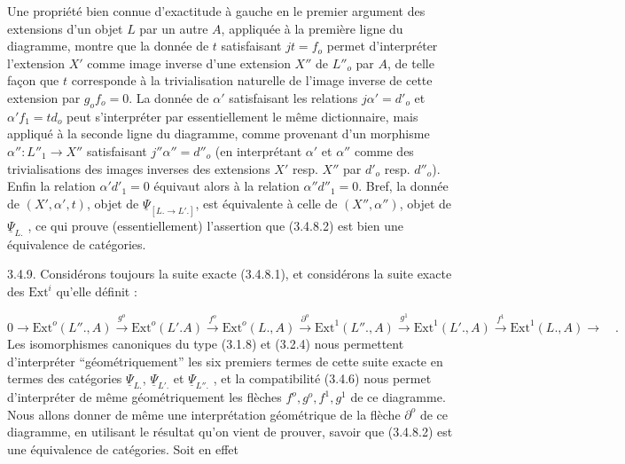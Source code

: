 Une propriété bien connue d'exactitude à gauche en le premier argument des extensions d'un objet $L$ par un autre $A$, appliquée à la première ligne du diagramme, montre que la donnée de $t$ satisfaisant $jt = f_o$ permet d'interpréter l'extension $X'$ comme image inverse d'une extension $X''$ de $L''_o$ par $A$, de telle façon que $t$ corresponde à la trivialisation naturelle de l'image inverse de cette extension par $g_o f_o = 0$. La donnée de $\alpha'$ satisfaisant les relations $j\alpha' = d'_o$ et $\alpha'f_1 = td_o$ peut s'interpréter par essentiellement le même dictionnaire, mais appliqué à la seconde ligne du diagramme, comme provenant d'un morphisme $\alpha'' : L''_1 \longrightarrow X''$ satisfaisant $j''\alpha'' = d''_o$ (en interprétant $\alpha'$ et $\alpha''$ comme des trivialisations des images inverses des extensions $X'$ resp. $X''$ par $d'_o$ resp. $d''_o$). Enfin la relation $\alpha'd'_1 = 0$ équivaut alors à la relation $\alpha''d''_1 = 0$. Bref, la donnée de $(X',\alpha',t)$, objet de $\underline{\Psi}_{[L. \longrightarrow L'.]}$, est équivalente à celle de $(X'',\alpha'')$, objet de $\underline{\Psi}_{L.}$ , ce qui prouve (essentiellement) l'assertion que (3.4.8.2) est bien une équivalence de catégories.

3.4.9. Considérons toujours la suite exacte (3.4.8.1), et considérons la suite exacte des $\mathrm{Ext}^i$ qu'elle définit :

\begin{equation}\tag{3.4.9.1}
0 \longrightarrow \mathrm{Ext}^o(L''.,A) \stackrel{g^o}{\longrightarrow} \mathrm{Ext}^o(L'.A) \stackrel{f^o}{\longrightarrow} \mathrm{Ext}^o(L.,A) \stackrel{\partial^o}{\longrightarrow} \mathrm{Ext}^1(L''.,A) \stackrel{g^1}{\longrightarrow} \mathrm{Ext}^1(L'.,A) \stackrel{f^1}{\longrightarrow} \mathrm{Ext}^1(L.,A) \longrightarrow \quad .
\end{equation}
Les isomorphismes canoniques du type (3.1.8) et (3.2.4) nous permettent d'interpréter ``géométriquement'' les six premiers termes de cette suite exacte en termes des catégories $\underline{\Psi}_{L.}$, $\underline{\Psi}_{L'.}$ et $\underline{\Psi}_{L''.}$ , et la compatibilité (3.4.6) nous permet d'interpréter de même géométriquement les flèches
$f^o,g^o,f^1,g^1$ de ce diagramme. Nous allons donner de même une interprétation géométrique de la flèche $\partial^o$ de ce diagramme, en utilisant le résultat qu'on vient de prouver, savoir que (3.4.8.2) est une équivalence de catégories. Soit en effet


